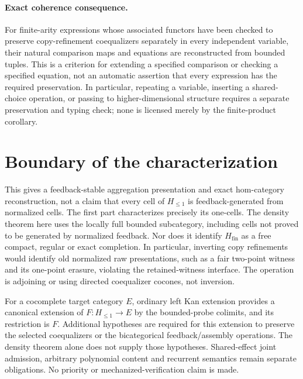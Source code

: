 \documentclass[11pt]{article}
\newcommand{\Ha}{H_{\leq 1}}
\newcommand{\HM}{H_{\mathrm{fin}}}
\newcommand{\Hh}{\HM}
\newcommand{\Bb}{\Ha}
\begin{document}
\paragraph{Exact coherence consequence.}
For finite-arity expressions whose associated functors have been checked
to preserve copy-refinement coequalizers separately in every independent
variable, their natural comparison maps and equations are reconstructed
from bounded tuples. This is a criterion for extending a specified
comparison or checking a specified equation, not an automatic assertion
that every expression has the required preservation. In particular,
repeating a variable, inserting a shared-choice operation, or passing to
higher-dimensional structure requires a separate preservation and typing
check; none is licensed merely by the finite-product corollary.

\section{Boundary of the characterization}
This gives a feedback-stable aggregation presentation and exact hom-category
reconstruction, not a claim that every cell of $\Bb$ is feedback-generated from normalized cells. The first part characterizes precisely its one-cells. The density theorem here uses the locally full bounded subcategory, including cells not proved to be generated by normalized feedback. Nor does it identify $\Hh$ as a free compact, regular or exact
completion. In particular, inverting copy refinements would identify old
normalized raw presentations, such as a fair two-point witness and its
one-point erasure, violating the retained-witness interface. The operation is
adjoining or using directed coequalizer cocones, not inversion.

For a cocomplete target category $E$, ordinary left Kan extension provides a
canonical extension of $F:\Bb\to E$ by the bounded-probe colimits, and its
restriction is $F$. Additional hypotheses are required for this extension to
preserve the selected coequalizers or the bicategorical feedback/assembly
operations. The density theorem alone does not supply those hypotheses.
Shared-effect joint admission, arbitrary polynomial content and recurrent
semantics remain separate obligations. No priority or mechanized-verification
claim is made.
\end{document}
